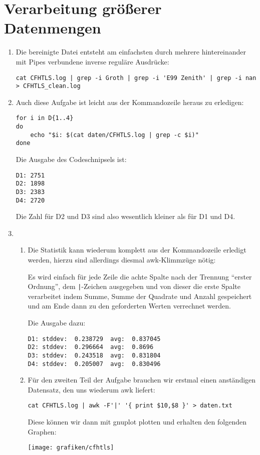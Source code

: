 \section{Verarbeitung größerer Datenmengen}

\begin{enumerate}
  \item Die bereinigte Datei entsteht am einfachsten durch mehrere
    hintereinander mit Pipes verbundene inverse reguläre Ausdrücke:
    \begin{lstlisting}
cat CFHTLS.log | grep -i Groth | grep -i 'E99 Zenith' | grep -i nan > CFHTLS_clean.log
    \end{lstlisting}
  \item Auch diese Aufgabe ist leicht aus der Kommandozeile heraus zu erledigen:
    \begin{lstlisting}
for i in D{1..4}
do
    echo "$i: $(cat daten/CFHTLS.log | grep -c $i)"
done
    \end{lstlisting}
    Die Ausgabe des Codeschnipsels ist:
    \begin{verbatim}
D1: 2751
D2: 1898
D3: 2383
D4: 2720
    \end{verbatim}
    Die Zahl für D2 und D3 sind also wesentlich kleiner als für D1 und D4.

  \item
    \begin{enumerate}
      \item Die Statistik kann wiederum komplett aus der Kommandozeile erledigt
        werden, hierzu sind allerdings diesmal awk-Klimmzüge nötig:
        
        Es wird einfach für jede Zeile die achte Spalte nach der Trennung
        "`erster Ordnung"', dem \verb'|'-Zeichen ausgegeben und von dieser die
        erste Spalte verarbeitet indem Summe, Summe der Quadrate und Anzahl
        gespeichert und am Ende dann zu den geforderten Werten verrechnet
        werden.

        Die Ausgabe dazu:
        \begin{verbatim}
D1: stddev:  0.238729  avg:  0.837045
D2: stddev:  0.296664  avg:  0.8696
D3: stddev:  0.243518  avg:  0.831804
D4: stddev:  0.205007  avg:  0.830496        
        \end{verbatim}
      \item Für den zweiten Teil der Aufgabe brauchen wir erstmal einen
        anständigen Datensatz, den uns wiederum awk liefert:
        \begin{lstlisting}
cat CFHTLS.log | awk -F'|' '{ print $10,$8 }' > daten.txt
        \end{lstlisting}
        Diese können wir dann mit gnuplot plotten und erhalten den folgenden
        Graphen:
          \begin{center}
            \texttt{[image: grafiken/cfhtls]}
          \end{center}
    \end{enumerate}
\end{enumerate}
